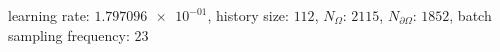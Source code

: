 learning rate: $\num[scientific-notation=true]{1.797096e-01}$, history size: $\num[scientific-notation=false]{112}$, $N_{\Omega}$: $\num[scientific-notation=false]{2115}$, $N_{\partial\Omega}$: $\num[scientific-notation=false]{1852}$, batch sampling frequency: $\num[scientific-notation=false]{23}$